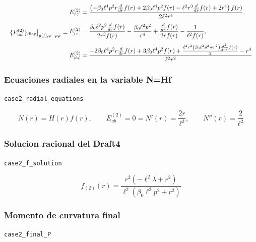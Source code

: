 \documentclass[11pt,a4paper]{article}
\begin{document}
\[
\resizebox{\textwidth}{!}{$\displaystyle \{E^{(2)}_{aa}\}_{\rm diag}\big|_{g[f],\phi=p\varphi} = \begin{aligned}&E^{(2)}_{\tau\tau}=\frac{\left(- \beta_{0} \ell^{4} p^{2} r \frac{d}{d r} f{\left(r \right)} + 2 \beta_{0} \ell^{4} p^{2} f{\left(r \right)} - \ell^{2} r^{3} \frac{d}{d r} f{\left(r \right)} + 2 r^{4}\right) f{\left(r \right)}}{2 \ell^{2} r^{4}},\\[4pt]&E^{(2)}_{rr}=\frac{\beta_{0} \ell^{2} p^{2} \frac{d}{d r} f{\left(r \right)}}{2 r^{3} f{\left(r \right)}} - \frac{\beta_{0} \ell^{2} p^{2}}{r^{4}} + \frac{\frac{d}{d r} f{\left(r \right)}}{2 r f{\left(r \right)}} - \frac{1}{\ell^{2} f{\left(r \right)}},\\[4pt]&E^{(2)}_{\varphi\varphi}=\frac{- 2 \beta_{0} \ell^{4} p^{2} r \frac{d}{d r} f{\left(r \right)} + 3 \beta_{0} \ell^{4} p^{2} f{\left(r \right)} + \frac{\ell^{2} r^{2} \left(\beta_{0} \ell^{2} p^{2} + r^{2}\right) \frac{d^{2}}{d r^{2}} f{\left(r \right)}}{2} - r^{4}}{\ell^{2} r^{2}}\end{aligned}$}
\]

\subsubsection{Ecuaciones radiales en la variable N=Hf}

\noindent\texttt{case2\_radial\_equations}\par\nopagebreak[4]

\[
N(r)=H(r)f(r),\qquad E^{(2)}_{ab}=0 = N'(r)=\frac{2r}{\ell^2},\qquad N''(r)=\frac{2}{\ell^2}
\]

\subsubsection{Solucion racional del Draft4}

\noindent\texttt{case2\_f\_solution}\par\nopagebreak[4]

\[
f_{(2)}(r) = \frac{r^{2} \left(- \ell^{2} \lambda + r^{2}\right)}{\ell^{2} \left(\beta_{0} \ell^{2} p^{2} + r^{2}\right)}
\]

\subsubsection{Momento de curvatura final}

\noindent\texttt{case2\_final\_P}\par\nopagebreak[4]
\end{document}
